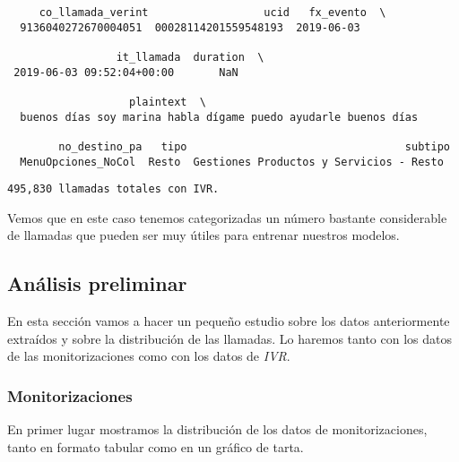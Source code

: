     
    \begin{verbatim}
     co_llamada_verint                  ucid   fx_evento  \
  9136040272670004051  00028114201559548193  2019-06-03   

                 it_llamada  duration  \
 2019-06-03 09:52:04+00:00       NaN   

                   plaintext  \
  buenos días soy marina habla dígame puedo ayudarle buenos días

        no_destino_pa   tipo                                  subtipo  
  MenuOpciones_NoCol  Resto  Gestiones Productos y Servicios - Resto  
    \end{verbatim}

    
    \begin{Verbatim}[commandchars=\\\{\}]
495,830 llamadas totales con IVR.
    \end{Verbatim}

    Vemos que en este caso tenemos categorizadas un número bastante considerable de
llamadas que pueden ser muy útiles para entrenar nuestros modelos.

    \hypertarget{anuxe1lisis-preliminar}{%
\subsection{Análisis preliminar}\label{anuxe1lisis-preliminar}}

    En esta sección vamos a hacer un pequeño estudio sobre los datos
anteriormente extraídos y sobre la distribución de las llamadas. Lo haremos tanto con los datos de las
monitorizaciones como con los datos de \textit{IVR}.

\subsubsection{Monitorizaciones}

En primer lugar mostramos la distribución de los datos de monitorizaciones, tanto en formato tabular como en un gráfico de tarta.
\vspace{0.5cm}

